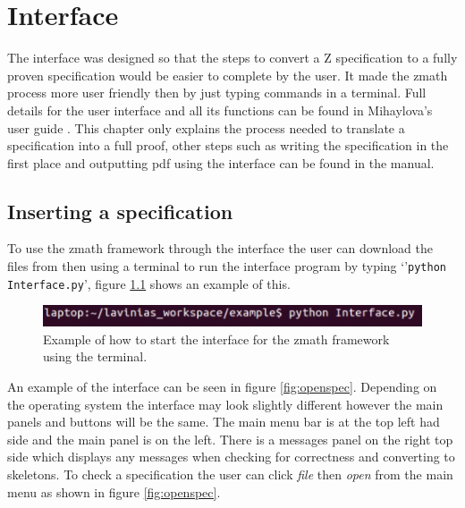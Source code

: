 \chapter{Interface}
\label{ch:interface}

The interface was designed so that the steps to convert a Z specification to a
fully proven specification would be easier to complete by the user. It made the
\gls{zmath} process more user friendly then by just typing commands in a
terminal. Full details for the user interface and all its functions can be found
in Mihaylova's user guide \cite{zmathuser}. This chapter only explains the process
needed to translate a specification into a full proof, other steps such as
writing the specification in the first place and outputting pdf using the
interface can be found in the manual.

\section{Inserting a specification}
To use the \gls{zmath} framework through the interface the user can download the
files from \cite{zmathweb} then using a terminal to run the interface program by
typing \newline `'\verb|python Interface.py|', figure \ref{fig:startinterface}
shows an example of this.

\begin{figure}[H]
    \centering
\includegraphics[scale=0.8]{Figures/Interface/startinterface.png}
\caption{Example of how to start the interface for the \gls{zmath} framework using the terminal. \label{fig:startinterface}}
\end{figure}

An example of the interface can be seen in figure \ref{fig:openspec}. Depending
on the operating system the interface may look slightly different however the
main panels and buttons will be the same. The main menu bar is at the top left
had side and the main panel is on the left. There is a messages panel on the
right top side which displays any messages when checking for correctness and
converting to skeletons. To check a specification the user can click \emph{file}
then \emph{open} from the main menu as shown in figure \ref{fig:openspec}.

